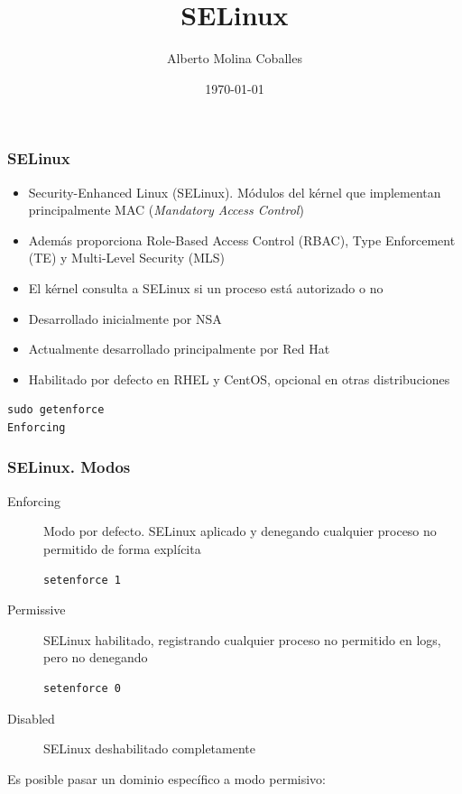 \documentclass[aspectratio=169]{beamer}
\author{Alberto Molina Coballes}
\title{SELinux}
\institute{IES Gonzalo Nazareno}
\date{\today}
\begin{document}
\def\braces#1{[#1]}

\begin{frame}[t,plain]
\titlepage
\end{frame}

\begin{frame}[fragile]
  \frametitle{SELinux}
  \begin{itemize}
  \item Security-Enhanced Linux (SELinux). Módulos del kérnel que
    implementan principalmente MAC (\textit{Mandatory Access Control})
  \item Además proporciona Role-Based Access Control (RBAC), Type
    Enforcement (TE) y Multi-Level Security (MLS)
  \item El kérnel consulta a SELinux si un proceso está autorizado o no
  \item Desarrollado inicialmente por NSA
  \item Actualmente desarrollado principalmente por Red Hat
  \item Habilitado por defecto en RHEL y CentOS, opcional en otras distribuciones
  \end{itemize}
  \begin{lstlisting}
sudo getenforce
Enforcing
  \end{lstlisting}
\end{frame}

\begin{frame}[fragile]
  \frametitle{SELinux. Modos}
  \begin{description}
  \item[Enforcing] Modo por defecto. SELinux aplicado y denegando cualquier proceso no permitido de forma explícita
    \begin{lstlisting}
setenforce 1
    \end{lstlisting}
  \item[Permissive] SELinux habilitado, registrando cualquier proceso no permitido en logs, pero no denegando
    \begin{lstlisting}
setenforce 0
    \end{lstlisting}
\item[Disabled] SELinux deshabilitado completamente
\end{description}
Es posible pasar un dominio específico a modo permisivo:
\end{frame}
\end{document}
